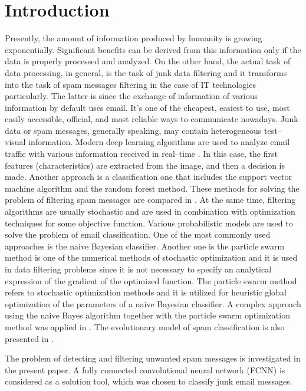 \documentclass[12pt]{jpconf}
\begin{document}
\section{Introduction}
Presently, the amount of information produced by humanity
is growing exponentially. Significant benefits can be derived from this information only if the data is properly processed and analyzed.
On the other hand, the actual task of data processing, in general, is the task of junk data filtering and it transforms into the task of spam messages filtering in the case of IT technologies particularly.
The latter is since the exchange of information of various information by default uses email. It's one of the cheapest, easiest to use, most easily accessible, official, and most reliable ways to communicate nowadays.
Junk data or spam messages, generally speaking, may contain heterogeneous test--visual information. Modern deep
learning algorithms are used to analyze email traffic with various information received in real--time \cite{Makkar2021}.
In this case, the first features (characteristics) are extracted from the image, and then a decision is made.
Another approach is a classification one that includes the support vector machine algorithm and the random forest method. These methods for solving the problem of filtering spam messages are compared in \cite{Taylor2020}.
At the same time, filtering algorithms are usually stochastic \cite{Garg2021} and are used in combination with optimization techniques for some objective function. Various probabilistic models are used to solve the problem of email classification. One of the most commonly used approaches is the naive Bayesian classifier. Another one is the particle swarm method is one of the numerical methods of stochastic optimization and it is used in data filtering problems since it is not necessary to specify an analytical expression of the gradient of the optimized function. The particle swarm method refers to stochastic optimization methods and it is utilized for heuristic global optimization of the parameters of a naive Bayesian classifier. A complex approach using the naive Bayes algorithm together with the particle swarm optimization method was applied in \cite{Parmar2020}.
The evolutionary model of spam classification is also presented in \cite{Mohammad2020}.

The problem of detecting and filtering unwanted spam messages is investigated in the present paper. A fully connected convolutional neural network ({FCNN}) is considered as a solution tool, which was chosen to classify junk email messages.
\end{document}
